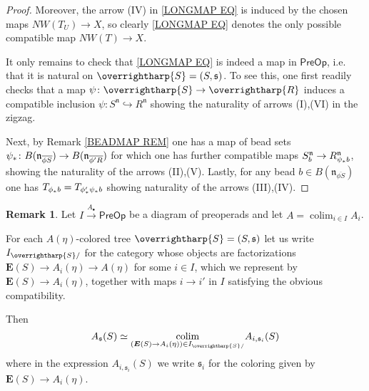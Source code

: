 \documentclass[a4paper,10pt]{article}%
\numberwithin{equation}{section}
\numberwithin{figure}{section}
\theoremstyle{definition} %
\newtheorem{remark}[equation]{Remark}%
\newcommand{\vect}[1]{\text{\overrightharp{\ensuremath{#1}}}}
\DeclareMathOperator{\colim}{colim}%
\newcommand{\1}{\ensuremath{\mathbbm 1}}%
\begin{document}
\begin{proof}
	Moreover, the arrow (IV) in \eqref{LONGMAP EQ}
	is induced by the chosen maps
	$NW(T_U) \to X$,
	so clearly 
	\eqref{LONGMAP EQ}
	denotes the only possible compatible map
	$NW(T) \to X$.

	It only remains to check that
	\eqref{LONGMAP EQ}
	is indeed a map in 
	$\mathsf{PreOp}$, i.e. that it is natural on 
	$\vect{S}=(S,\mathfrak{s})$.
	To see this, one first readily checks that a map
	$\psi \colon \vect{S} \to \vect{R}$
	induces a compatible inclusion
	$\psi \colon S^{\mathfrak{n}} \hookrightarrow R^{\mathfrak{n}}$
	showing the naturality of arrows (I),(VI) 
	in the zigzag.

	Next, by Remark \ref{BEADMAP REM}
	one has a map of bead sets
	$\psi_{\**} \colon 
	B(\mathfrak{n}_{\overline{\phi S}})
	\to
	B(\mathfrak{n}_{\overline{\phi' R}})$
	for which one has further compatible maps
	$S^{\mathfrak{n}}_b
	\to 
	R^{\mathfrak{n}}_{\psi_{\**}b}$,
	showing the naturality of the arrows (II),(V).
	Lastly, for any bead 
	$b \in B(\mathfrak{n}_{\overline{\phi S}})$
	one has
	$T_{\phi_{\**}b} = T_{\phi'_{\**} \psi_{\**}b}$
	showing naturality of the arrows (III),(IV).
\end{proof}





\begin{remark}\label{PREOPCOLEV REM}
	Let $I \xrightarrow{A_{\bullet}} \mathsf{PreOp}$
	be a diagram of preoperads and let
	$A = \colim_{i \in I} A_i$.
	
	For each $A(\eta)$-colored tree 
	$\vect{S} = (S,\mathfrak{s})$
	let us write
	$I_{\vect{S}/}$
	for the category whose objects are factorizations
	$\boldsymbol{E}(S) \to A_i(\eta) \to A(\eta)$ 
	for some $i \in I$,
	which we represent by 
	$\boldsymbol{E}(S) \to A_i(\eta)$,
	together with maps $i \to i'$ in $I$
	satisfying the obvious compatibility.
	
	Then
\begin{equation}\label{COLIMALT EQ}
	A_{\mathfrak{s}}(S) \simeq 
	\underset{(\boldsymbol{E}(S) \to A_i(\eta)) \in I_{\vect{S}/}}{\colim}
	A_{i,
	\mathfrak{s}_i}(S)
\end{equation}
	where in the expression 
	$A_{i,\mathfrak{s}_i}(S)$
	we write 
	$\mathfrak{s}_i$
	for the coloring given by
	$\boldsymbol{E}(S) \to A_i(\eta)$.
\end{remark}
\end{document}
